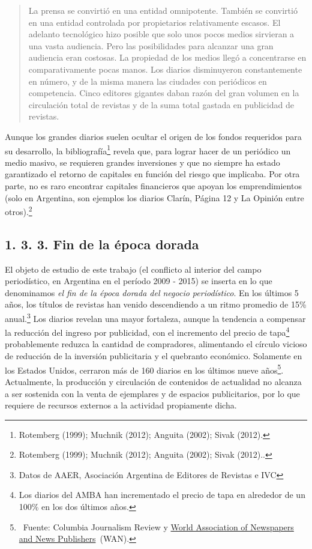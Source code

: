 \begin{quote}
La prensa se convirtió en una entidad omnipotente. También se convirtió en una entidad controlada por propietarios relativamente escasos. El adelanto tecnológico hizo posible que solo unos pocos medios sirvieran a una vasta audiencia. Pero las posibilidades para alcanzar una gran audiencia eran costosas. La propiedad de los medios llegó a concentrarse en comparativamente pocas manos. Los diarios disminuyeron constantemente en número, y de la misma manera las ciudades con periódicos en competencia. Cinco editores gigantes daban razón del gran volumen en la circulación total de revistas y de la suma total gastada en publicidad de revistas.
\end{quote}

Aunque los grandes diarios suelen ocultar el origen de los fondos requeridos para su desarrollo, la bibliografía\footnote{Rotemberg (1999); Muchnik (2012); Anguita (2002); Sivak (2012).} revela que, para lograr hacer de un periódico un medio masivo, se requieren grandes inversiones y que no siempre ha estado garantizado el retorno de capitales en función del riesgo que implicaba. Por otra parte, no es raro encontrar capitales financieros que apoyan los emprendimientos (solo en Argentina, son ejemplos los diarios Clarín, Página 12 y La Opinión entre otros).\footnote{Rotemberg (1999); Muchnik (2012); Anguita (2002); Sivak (2012)..}

\subsection{1. 3. 3. Fin de la época dorada}

El objeto de estudio de este trabajo (el conflicto al interior del campo periodístico, en Argentina en el período 2009 - 2015) se inserta en lo que denominamos \emph{el fin de la época dorada del negocio periodístico}. En los últimos 5 años, los títulos de revistas han venido descendiendo a un ritmo promedio de 15\% anual.\footnote{Datos de AAER, Asociación Argentina de Editores de Revistas e IVC} Los diarios revelan una mayor fortaleza, aunque la tendencia a compensar la reducción del ingreso por publicidad, con el incremento del precio de tapa\footnote{Los diarios del AMBA han incrementado el precio de tapa en alrededor de un 100\% en los dos últimos años.} probablemente reduzca la cantidad de compradores, alimentando el círculo vicioso de reducción de la inversión publicitaria y el quebranto económico. Solamente en los Estados Unidos, cerraron más de 160 diarios en los últimos nueve años\footnote{~Fuente: Columbia Journalism Review y \href{http://www.wan-ifra.org/}{World Association of Newspapers and News Publishers}~(WAN).}. Actualmente, la producción y circulación de contenidos de actualidad no alcanza a ser sostenida con la venta de ejemplares y de espacios publicitarios, por lo que requiere de recursos externos a la actividad propiamente dicha.

